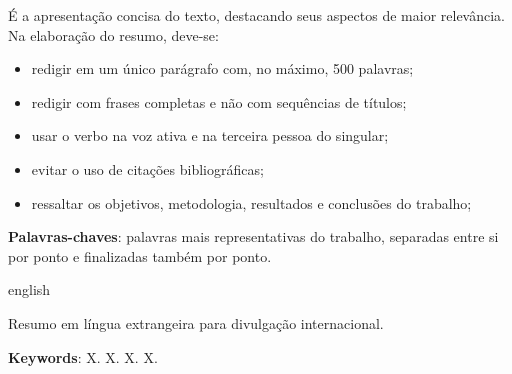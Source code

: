 
\setlength{\absparsep}{18pt} %
\begin{resumo}
É a apresentação concisa do texto, destacando seus aspectos de maior relevância. Na elaboração do resumo, deve-se:

\begin{itemize}
    \item redigir em um único parágrafo com, no máximo, 500 palavras;
    \item redigir com frases completas e não com sequências de títulos;
    \item usar o verbo na voz ativa e na terceira pessoa do singular;
    \item evitar o uso de citações bibliográficas;
    \item ressaltar os objetivos, metodologia, resultados e conclusões do trabalho;
\end{itemize}

\textbf{Palavras-chaves}: palavras mais representativas do trabalho, separadas entre si por ponto e finalizadas também por ponto.
\end{resumo}

\begin{resumo}[Abstract]
 \begin{otherlanguage*}{english}

Resumo em língua extrangeira para divulgação internacional.

   \textbf{Keywords}: X. X. X. X.
 \end{otherlanguage*}
\end{resumo}